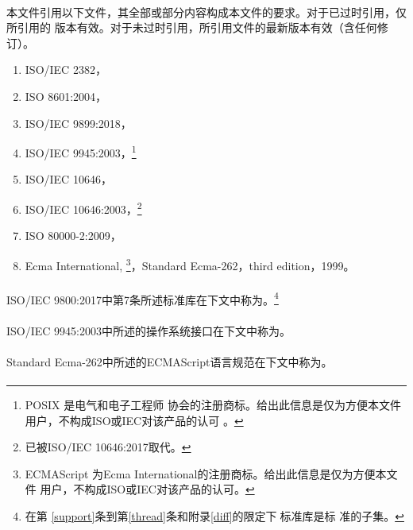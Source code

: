 \paragraph{}
本文件引用以下文件，其全部或部分内容构成本文件的要求。对于已过时引用，仅所引用的
版本有效。对于未过时引用，所引用文件的最新版本有效（含任何修订）。
\begin{enumerate}
  \item{ISO/IEC 2382，}
  \item{ISO 8601:2004，}
  \item{ISO/IEC 9899:2018，}
  \item{ISO/IEC 9945:2003，\footnote{POSIX \textregistered{}是电气和电子工程师
    协会的注册商标。给出此信息是仅为方便本文件用户，不构成ISO或IEC对该产品的认可
    。}}
  \item{ISO/IEC 10646，}
  \item{ISO/IEC 10646:2003，\footnote{已被ISO/IEC 10646:2017取代。}
    }
  \item{ISO 80000-2:2009，}
  \item{Ecma International,  \footnote{ECMAScript
    \textregistered{}为Ecma International的注册商标。给出此信息是仅为方便本文件
    用户，不构成ISO或IEC对该产品的认可。}，Standard
    Ecma-262，third edition，1999。}
\end{enumerate}

\paragraph{}
ISO/IEC 9800:2017中第7条所述标准库在下文中称为。\footnote{在第
\ref{support}条到第\ref{thread}条和附录\ref{diff}的限定下，\c{}标准库是\cpp{}标
准的子集。}

\paragraph{}
ISO/IEC 9945:2003中所述的操作系统接口在下文中称为。

\paragraph{}
Standard Ecma-262中所述的ECMAScript语言规范在下文中称为。

\paragraph{}
